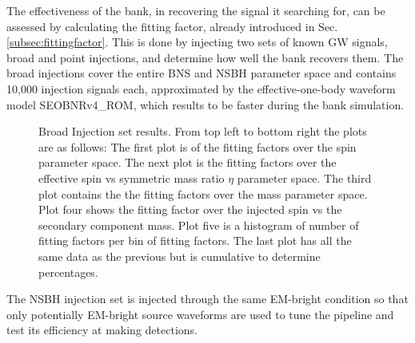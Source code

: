 \documentclass[binding=0.6cm, LaM]{sapthesis}
\begin{document}
	The effectiveness of the bank, in recovering the signal it searching for,
        can be assessed by calculating the fitting factor,
        already introduced in Sec.\,\ref{subsec:fittingfactor}.
        This is done by injecting two sets of known GW signals, broad and point injections,
        and determine how well the bank recovers them.
	The broad injections cover the entire BNS and NSBH parameter space and contains 10,000 injection signals each,
	approximated by the effective-one-body waveform model SEOBNRv4\_ROM, 
	which results to be faster during the bank simulation.
        \begin{figure}[!t]
          \noindent
          \label{fittingfactor}
          \centering
          \caption{Broad Injection set results. From top left to bottom right the plots are as follows: The first plot is of the fitting factors over the spin parameter space. The next plot is the fitting factors over the effective spin vs symmetric mass ratio $\eta$ parameter space. The third plot contains the the fitting factors over the mass parameter space. 
Plot four shows the fitting factor over the injected spin vs the secondary component mass. Plot five is a histogram of number of fitting factors per bin of fitting factors. The last plot has all the same data as the previous but is cumulative to determine percentages.}
\label{fig:fittingfactor}
\end{figure}
	The NSBH injection set is injected  through the same EM-bright condition so that
	only potentially EM-bright source waveforms are used to tune the pipeline and test its efficiency at making detections.
\end{document}
